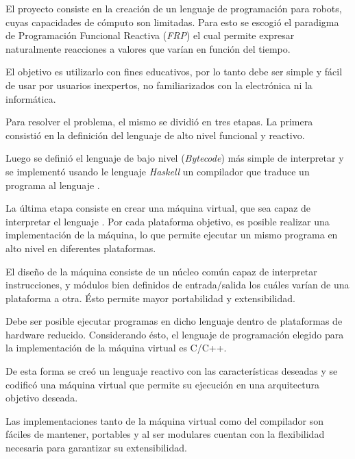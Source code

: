 
  El proyecto consiste en la creación de un lenguaje de programación
para robots, cuyas capacidades de cómputo son limitadas.
  Para esto se escogió el paradigma de Programación Funcional Reactiva
(\emph{FRP}) el cual permite expresar naturalmente reacciones a
valores que varían en función del tiempo.

  El objetivo es utilizarlo con fines educativos,
por lo tanto debe ser simple y fácil de usar por usuarios
inexpertos, no familiarizados con la electrónica ni la informática.

  Para resolver el problema, el mismo se dividió en tres etapas.  
  La primera consistió en la definición del lenguaje \frob{} de alto
nivel funcional y reactivo.

  Luego se definió el lenguaje \alf{} de bajo nivel (\emph{Bytecode}) más
simple de interpretar y se implementó usando le lenguaje \textit{Haskell} un
compilador que traduce un programa \frob{} al lenguaje \alf{}.

  La última etapa consiste en crear una máquina virtual, que
sea capaz de interpretar el lenguaje \alf{}.
  Por cada plataforma objetivo, es posible realizar una implementación de
la máquina, lo que permite ejecutar un mismo programa en alto nivel en
diferentes plataformas.

  El diseño de la máquina consiste de un núcleo común capaz de interpretar
instrucciones, y módulos bien definidos de
entrada/salida los cuáles varían de una plataforma a otra.
  Ésto permite mayor portabilidad y extensibilidad.

  Debe ser posible ejecutar programas en dicho lenguaje dentro de plataformas
de hardware reducido.
  Considerando ésto, el lenguaje de programación elegido para la
implementación de la máquina virtual es C/C++.

  De esta forma se creó un lenguaje reactivo con las
características deseadas y se codificó una máquina
virtual que permite su ejecución en una arquitectura objetivo deseada.

  Las implementaciones tanto de la máquina virtual como del compilador
son fáciles de mantener, portables y al ser modulares
cuentan con la flexibilidad necesaria para garantizar su extensibilidad.
